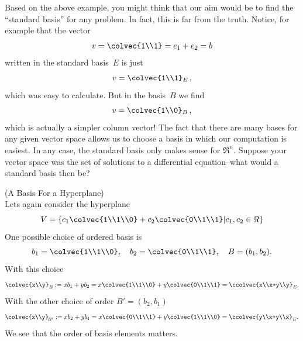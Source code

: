 \begin{example}

\end{example}

Based on the above example, you might think that our aim would be to find the ``standard basis'' for any problem. 
In fact, this is far from the truth. Notice, for example that the vector $$v=\colvec{1\\1}=e_1+e_2=b$$ written in the standard basis~$E$ is just
$$
v=\colvec{1\\1}_E\, ,
$$
which was easy to calculate. But in the basis~$B$ we find
$$
v=\colvec{1\\0}_B\, ,
$$
which is actually a simpler column vector!
The fact that there are many bases for any given vector space allows us to choose a basis in which our computation is easiest. 
In any case, the standard basis only makes sense for $\Re^n$. Suppose your vector space was the set of solutions to a differential equation--what would a standard basis then be?



\begin{example} (A Basis For a Hyperplane)\\
Lets again consider the hyperplane
$$
V=\left\{  c_1\colvec{1\\1\\0} +c_2\colvec{0\\1\\1} \middle| c_1,c_2\in \Re \right\} 
$$
One possible choice of ordered basis is 
$$b_1=\colvec{1\\1\\0},~~~b_2=\colvec{0\\1\\1}, ~~~
B=(b_1,b_2).
$$
With this choice
$$
\colvec{x\\y}_B := xb_1+ y b_2 
=x\colvec{1\\1\\0}+y \colvec{0\\1\\1}=\ccolvec{x\\x+y\\y}_E.
$$
With the other choice of order $B'=(b_2, b_1)$ 
$$
\colvec{x\\y}_{\!B'} := xb_2+ y b_1 
=x\colvec{0\\1\\1}+y \colvec{1\\1\\0}=\ccolvec{y\\x+y\\x}_E.
$$
We see that the  order of basis elements matters. 
\end{example}

